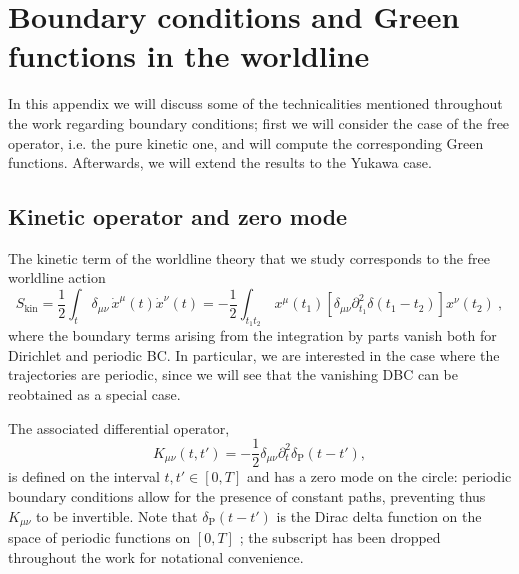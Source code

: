 \documentclass[12pt,a4paper]{article}
\numberwithin{equation}{section}
\numberwithin{equation}{section}
\begin{document}
\appendix


\section{Boundary conditions and Green functions in the worldline} \label{appA}
In this appendix we will discuss some of the technicalities mentioned throughout the work regarding boundary conditions; first we will consider the case of the free operator, i.e. the pure kinetic one, and will compute the corresponding Green functions. Afterwards, we will extend the results to the Yukawa case.

\subsection{Kinetic operator and zero mode}
The kinetic term of the worldline theory that we study corresponds to the free worldline action
\begin{equation}
S_{\mathrm{kin}}=\frac12 \int_t \, \delta_{\mu\nu} \, \dot{x}^\mu(t)\dot{x}^\nu(t)=-\frac12 \int_{t_1t_2} \, x^\mu(t_1)\left[ 
\delta_{\mu\nu} \partial^2_{t_1} \delta(t_1-t_2) \right] x^\nu(t_2)\ ,
\end{equation}
where the boundary terms arising from the integration by parts vanish both for Dirichlet and periodic BC.
In particular, we are interested in the case where the trajectories are periodic, since we will see that the vanishing DBC can be reobtained as a special case.

The associated differential operator,
\begin{equation}
K_{\mu\nu}(t,t')=-\frac12 \delta_{\mu\nu} \partial^2_{t} \delta_\mathrm{P}(t-t'),
\end{equation}
is defined on the interval $t,t'\in[0,T]$ and has a zero mode on the circle: periodic boundary conditions allow for the presence of constant paths, preventing thus $K_{\mu\nu}$ to be invertible. Note that $\delta_\mathrm{P}(t-t')$ is the Dirac delta function on the space of periodic functions on $[0,T]$ \cite{Bastianelli:2002qw}; the subscript has been dropped throughout the work for notational convenience. \\
\end{document}
